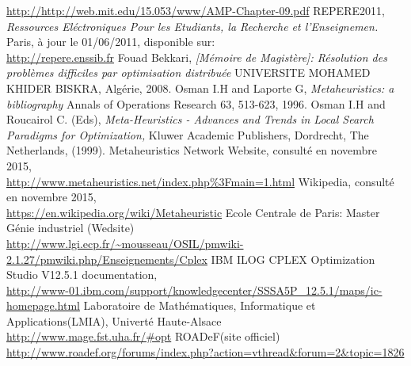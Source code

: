 \documentclass[a4paper,11pt,oneside]{report}
\theoremstyle{plain}
\newcommand{\0}{/ \! \! \! 0}
\theoremstyle{plain}
\begin{document}
\begin{thebibliography}{10}
\url{http://http://web.mit.edu/15.053/www/AMP-Chapter-09.pdf}
REPERE2011,\\
\emph{Ressources El\'ectroniques Pour les Etudiants, la Recherche et l'Enseignemen.}\\
Paris, \`a jour le 01/06/2011, disponible sur:\\
\url{http://repere.enssib.fr}
Fouad Bekkari,
\emph{[M\'emoire de Magist\`ere]: R\'esolution des probl\`emes difficiles par optimisation distribu\'ee}
UNIVERSITE MOHAMED KHIDER BISKRA, Alg\'erie, 2008.
Osman I.H and Laporte G,
\emph{Metaheuristics: a bibliography}
Annals of Operations Research 63, 513-623, 1996.
Osman I.H and Roucairol C. (Eds),
\emph{Meta-Heuristics - Advances and Trends in Local Search Paradigms for Optimization,}
 Kluwer Academic Publishers, Dordrecht, The Netherlands, (1999).
Metaheuristics Network Website, consult\'e en novembre 2015,\\
\url{http://www.metaheuristics.net/index.php\%3Fmain=1.html}
Wikipedia, consult\'e en novembre 2015,\\
\url{https://en.wikipedia.org/wiki/Metaheuristic}
Ecole Centrale de Paris: Master G\'enie industriel (Wedsite)\\
\url{http://www.lgi.ecp.fr/~mousseau/OSIL/pmwiki-2.1.27/pmwiki.php/Enseignements/Cplex}
IBM ILOG CPLEX Optimization Studio V12.5.1 documentation,\\
\url{http://www-01.ibm.com/support/knowledgecenter/SSSA5P_12.5.1/maps/ic-homepage.html}
Laboratoire de Math\'ematiques, Informatique et Applications(LMIA), Univert\'e Haute-Alsace\\
\url{http://www.mage.fst.uha.fr/#opt}
ROADeF(site officiel)\\
\url{http://www.roadef.org/forums/index.php?action=vthread&forum=2&topic=1826}
\end{thebibliography}
\end{document}
